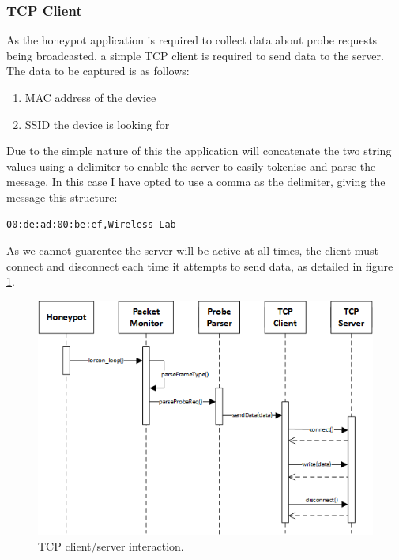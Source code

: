 \subsubsection{TCP Client}
\label{hp-tcp}
As the honeypot application is required to collect data about probe requests being broadcasted, a simple TCP client is required to send data to the server. The data to be captured is as follows:

\begin{enumerate}
\item MAC address of the device
\item SSID the device is looking for
\end{enumerate}

Due to the simple nature of this the application will concatenate the two string values using a delimiter to enable the server to easily tokenise and parse the message. In this case I have opted to use a comma as the delimiter, giving the message this structure:

\begin{verbatim}
00:de:ad:00:be:ef,Wireless Lab
\end{verbatim}

As we cannot guarentee the server will be active at all times, the client must connect and disconnect each time it attempts to send data, as detailed in figure \ref{fig:hp_tcp_server}. 

\begin{figure}[h!]
\centering\includegraphics[width=\linewidth]{design/figures/hp-tcp-client.png}
\caption{TCP client/server interaction.}
\label{fig:hp_tcp_server}
\end{figure}

